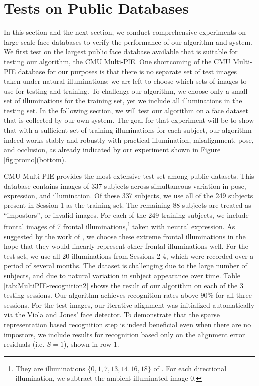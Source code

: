 \documentclass[10pt,journal,letterpaper,compsoc]{IEEEtran} %
\begin{document}
\section{Tests on Public Databases}\label{sec:multipie}
In this section and the next section, we conduct comprehensive experiments on
large-scale face databases to verify the performance of our algorithm and
system. We first test on the largest public face database available that is
suitable for testing our algorithm, the CMU Multi-PIE.  One shortcoming of the
CMU Multi-PIE database for our purposes is that there is no separate set of
test images taken under natural illuminations; we are left to choose which sets
of images to use for testing and training.  To challenge our algorithm, we
choose only a small set of illuminations for the training set, yet we include
all illuminations in the testing set. In the following section, we will test
our algorithm on a face dataset that is collected by our own system. The goal
for that experiment will be to show that with a sufficient set of training
illuminations for each subject, our algorithm indeed works stably and robustly
with practical illumination, misalignment, pose, and occlusion, as already
indicated by our experiment shown in Figure \ref{fig:promo}(bottom).

CMU Multi-PIE provides the most extensive test set among public
datasets. This database contains images of 337 subjects across
simultaneous variation in pose, expression, and illumination.
Of these 337 subjects, we use all of the 249 subjects present
in Session 1 as the training set. The remaining 88 subjects are
treated as ``impostors'', or invalid images. For each of the
249 training subjects, we include frontal images of 7 frontal
illuminations,\footnote{They are illuminations
$\{0,1,7,13,14,16,18\}$ of \cite{Gross2008-FGR}. For each
directional illumination, we subtract the ambient-illuminated
image 0.} taken with neutral expression. As suggested by the
work of \cite{Georghiades2001-PAMI}, we choose these extreme
frontal illuminations in the hope that they would linearly
represent other frontal illuminations well. For the test set,
we use all 20 illuminations from Sessions 2-4, which were
recorded over a period of several months. The dataset is
challenging due to the large number of subjects, and due to
natural variation in subject appearance over time.
Table \ref{tab:MultiPIE-recognition2} shows the result of our
algorithm on each of the 3 testing sessions. Our algorithm
achieves recognition rates above $90\%$ for all three sessions.
For the test images, our iterative alignment was initialized
automatically via the Viola and Jones' face detector. To
demonstrate that the sparse representation based recognition
step is indeed beneficial even when there are no impostors, we
include results for recognition based only on the alignment
error residuals (i.e. $S=1$), shown in row 1.
\end{document}
